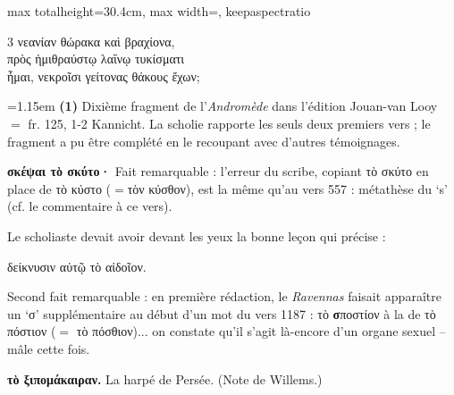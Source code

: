 \documentclass[11pt,twoside]{book}
\newcommand{\currHeadLE}{}
\newcommand{\currHeadRE}{}
\newcommand{\currHeadLO}{}
\newcommand{\currHeadRO}{}
\newcommand{\italique}[1]{\textit{#1}}
\newcommand{\citComm}[1]{\begin{quoting}[vskip=0.4pt,leftmargin=0.7em,rightmargin=0.2em]#1\end{quoting}}
\newcommand{\R}{\textbf{R}}
\begin{document}
\begin{adjustbox}{max totalheight=30.4cm, max width=\textwidth, keepaspectratio}
\begin{minipage}{\textwidth}
{\begin{multicols}{3}
{νεανίαν θώρακα καὶ βραχίονα,\\
πρὸς ἡμιθραύστῳ λαΐνῳ τυκίσματι\\
ἧμαι, νεκροῖσι γείτονας θάκους ἔχων;}
\par\vspace{1.5pt}
\par\vspace{1.2pt}\par\nopagebreak\vspace{1pt}\noindent\hangindent=1.15em {\color{sepiaNote}\textbf{(1)}} Dixième fragment de l'\italique{Andromède} dans l'édition Jouan-van Looy $=$ fr. 125, 1-2 Kannicht. La scholie rapporte les seuls deux premiers vers ; le fragment a pu être complété en le recoupant avec d'autres témoignages.
\par\vspace{1.5pt}
 \textbf{σκέψαι τὸ σκύτο·} Fait remarquable : l'erreur du scribe, copiant τὸ σκύτο en place de τὸ κύστο ($=$τὸν κύσθον), est la même qu'au vers 557 : métathèse du `s' (cf. le commentaire à ce vers).
\par\vspace{1.5pt}
\noindent Le scholiaste devait avoir devant les yeux la bonne leçon qui précise :
\citComm{δείκνυσιν αὐτῷ τὸ αἰδοῖον.}
\par\vspace{1.5pt}
\noindent Second fait remarquable : en première rédaction, le \italique{Ravennas} faisait apparaître un `σ' supplémentaire au début d'un mot du vers 1187 : τὸ \textbf{σ}ποστίον à la de τὸ πόστιον ($=$ τὸ πόσθιον)...  on constate qu'il s'agit là-encore d'un organe sexuel -- mâle cette fois.
\par\vspace{1.5pt}
 \textbf{τὸ ξιπομάκαιραν.} La harpé de Persée. (Note de Willems.)
\par\end{multicols}}
\end{minipage}\end{adjustbox}
\clearpage\ifodd\value{page}\hbox{}\newpage\fi
\renewcommand{\currHeadLE}{ΑΡΙΣΤΟΦΑΝΟΥΣ ΘΕΣΜΟΦΟΡΙΑΖΟΥΣΑΙ · CODEX RAVENNAS 429 (\R)}
\renewcommand{\currHeadRE}{Folio f. 176r (Classense 178r) · vv. 1128–1168}
\renewcommand{\currHeadLO}{FAC-SIMILÉ DU CODEX RAVENNAS 429 (\R) · f. 176r (Classense 178r)}
\renewcommand{\currHeadRO}{vv. 1128–1168 · Planche recadrée sur la zone écrite et harmonisée}
\end{document}
